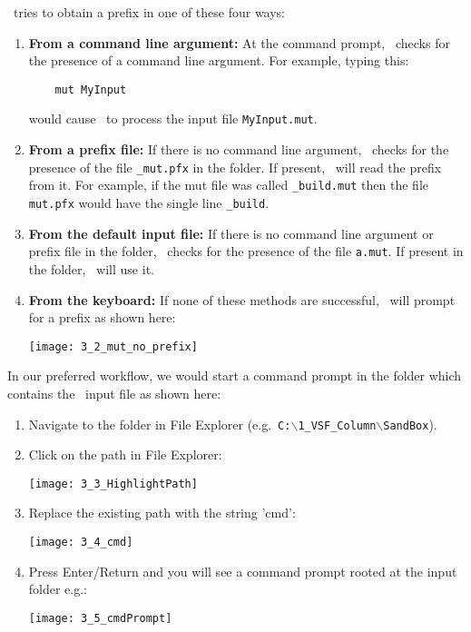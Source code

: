 \mut\ tries to obtain a prefix in one of these four ways:
\begin{enumerate}
    \item \textbf{From a command line argument:} \label{commarg} At the command prompt, \mut\ checks for the presence of a command line argument.  For example, typing this:
\begin{verbatim}
    mut MyInput
\end{verbatim}
        would cause \mut\ to process the input file \texttt{MyInput.mut}.
    \item \textbf{From a prefix file:} If there is no command line argument, \mut\ checks for the presence of the file \texttt{\_mut.pfx} in the folder.  If present, \mut\ will read the prefix from it. For example, if the mut file was called \texttt{\_build.mut} then the file \texttt{mut.pfx} would have the single line \texttt{\_build}.
    \item \textbf{From the default input file:} If there is no command line argument or prefix file in the folder, \mut\ checks for the presence of the file \texttt{a.mut}.  If present in the folder, \mut\ will use it.
    \item \textbf{From the keyboard:} If none of these methods are successful, \mut\ will prompt for a prefix as shown here:

        \texttt{[image: 3\_2\_mut\_no\_prefix]}

\end{enumerate}

 In our preferred workflow, we would start a command prompt in the folder which contains the \mut\ input file as shown here:
\begin{enumerate}
    \item  Navigate to the folder in File Explorer (e.g.\ \texttt{C:$\backslash$1\_VSF\_Column\-$\backslash$SandBox}).
   \item  Click on the path in File Explorer:

        \texttt{[image: 3\_3\_HighlightPath]}

    \item  Replace the existing path with the string 'cmd':

        \texttt{[image: 3\_4\_cmd]}

    \item Press Enter/Return and you will see a command prompt rooted at the input folder e.g.:

        \texttt{[image: 3\_5\_cmdPrompt]}

\end{enumerate}

